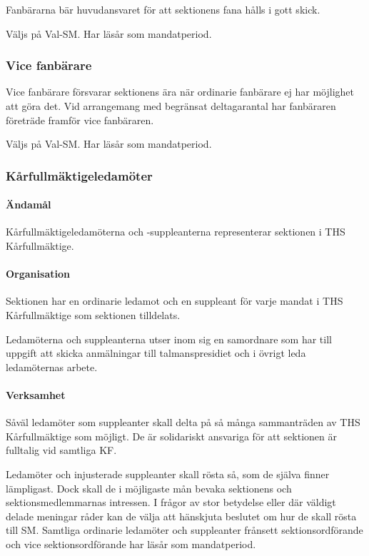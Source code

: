 \documentclass{dgovdoc}
\begin{document}
Fanbärarna bär huvudansvaret för att sektionens fana hålls i gott skick.

Väljs på Val-SM. Har läsår som mandatperiod.

\subsubsection{Vice fanbärare}

Vice fanbärare försvarar sektionens ära när ordinarie fanbärare ej har
möjlighet att göra det. Vid arrangemang med begränsat deltagarantal har
fanbäraren företräde framför vice fanbäraren.

Väljs på Val-SM. Har läsår som mandatperiod.

\subsubsection{Kårfullmäktigeledamöter}

\paragraph{Ändamål}

Kårfullmäktigeledamöterna och -suppleanterna representerar sektionen i THS
Kårfullmäktige.

\paragraph{Organisation}

Sektionen har en ordinarie ledamot och en suppleant för varje mandat i THS
Kårfullmäktige som sektionen tilldelats.

Ledamöterna och suppleanterna utser inom sig en samordnare som har till uppgift
att skicka anmälningar till talmanspresidiet och i övrigt leda ledamöternas
arbete.

\paragraph{Verksamhet}

Såväl ledamöter som suppleanter skall delta på så många sammanträden av THS
Kårfullmäktige som möjligt. De är solidariskt ansvariga för att sektionen är
fulltalig vid samtliga KF.

Ledamöter och injusterade suppleanter skall rösta så, som de själva finner
lämpligast. Dock skall de i möjligaste mån bevaka sektionens och
sektionsmedlemmarnas intressen. I frågor av stor betydelse eller där väldigt
delade meningar råder kan de välja att hänskjuta beslutet om hur de skall rösta
till SM. Samtliga ordinarie ledamöter och suppleanter frånsett
sektionsordförande och vice sektionsordförande har läsår som mandatperiod.
\end{document}
